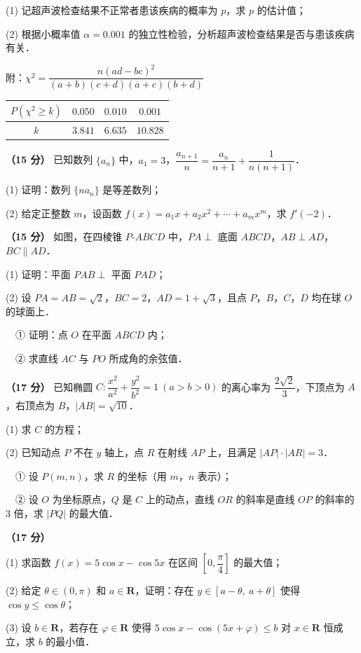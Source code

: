   (1) 记超声波检查结果不正常者患该疾病的概率为 $p$，求 $p$ 的估计值；

  (2) 根据小概率值 $\alpha=0.001$ 的独立性检验，分析超声波检查结果是否与患该疾病有关．

  附：$\chi^2=\dfrac{n(ad-bc)^2}{(a+b)(c+d)(a+c)(b+d)}$

\begin{center}
\begin{tabular}{cccc}
\toprule
$P(\chi^2\ge k)$ & $0.050$ & $0.010$ & $0.001$ \\
\midrule
$k$ & $3.841$ & $6.635$ & $10.828$ \\
\bottomrule
\end{tabular}
\end{center}

\textbf{（15 分）} 已知数列 $\{a_n\}$ 中，$a_1=3$，$\dfrac{a_{n+1}}{n}=\dfrac{a_n}{n+1}+\dfrac{1}{n(n+1)}$．

  (1) 证明：数列 $\{na_n\}$ 是等差数列；

  (2) 给定正整数 $m$，设函数 $f(x)=a_1x+a_2x^2+\cdots+a_mx^m$，求 $f'(-2)$．

\textbf{（15 分）} 如图，在四棱锥 $P\text{-}ABCD$ 中，$PA\perp$ 底面 $ABCD$，$AB\perp AD$，$BC\parallel AD$．

\begin{center}\end{center}

  (1) 证明：平面 $PAB\perp$ 平面 $PAD$；

  (2) 设 $PA=AB=\sqrt2$，$BC=2$，$AD=1+\sqrt3$，且点 $P$，$B$，$C$，$D$ 均在球 $O$ 的球面上．

  　① 证明：点 $O$ 在平面 $ABCD$ 内；

  　② 求直线 $AC$ 与 $PO$ 所成角的余弦值．

\textbf{（17 分）} 已知椭圆 $C:\dfrac{x^2}{a^2}+\dfrac{y^2}{b^2}=1\ (a>b>0)$ 的离心率为 $\dfrac{2\sqrt2}{3}$，下顶点为 $A$，右顶点为 $B$，$|AB|=\sqrt{10}$．

  (1) 求 $C$ 的方程；

  (2) 已知动点 $P$ 不在 $y$ 轴上，点 $R$ 在射线 $AP$ 上，且满足 $|AP|\cdot|AR|=3$．

  　① 设 $P(m,n)$，求 $R$ 的坐标（用 $m$，$n$ 表示）；

  　② 设 $O$ 为坐标原点，$Q$ 是 $C$ 上的动点，直线 $OR$ 的斜率是直线 $OP$ 的斜率的 $3$ 倍，求 $|PQ|$ 的最大值．

\textbf{（17 分）} 

  (1) 求函数 $f(x)=5\cos x-\cos 5x$ 在区间 $\left[0,\dfrac{\pi}{4}\right]$ 的最大值；

  (2) 给定 $\theta\in(0,\pi)$ 和 $a\in\mathbf{R}$，证明：存在 $y\in[a-\theta,\ a+\theta]$ 使得 $\cos y\le\cos\theta$；

  (3) 设 $b\in\mathbf{R}$，若存在 $\varphi\in\mathbf{R}$ 使得 $5\cos x-\cos(5x+\varphi)\le b$ 对 $x\in\mathbf{R}$ 恒成立，求 $b$ 的最小值．

\par\medskip

